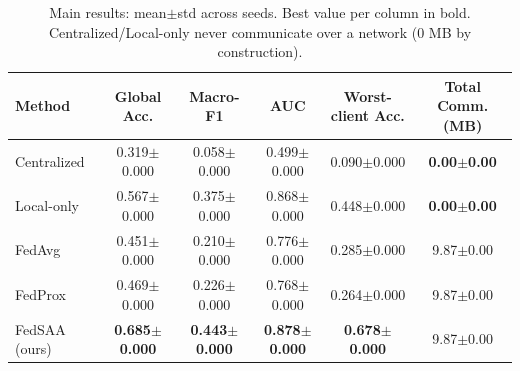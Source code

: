 \begin{table}[t]
\centering
\caption{Main results: mean$\pm$std across seeds. Best value per column in bold. Centralized/Local-only never communicate over a network (0 MB by construction).}
\label{tab:main_results}
\begin{tabular}{lccccc}
\toprule
Method & Global Acc. & Macro-F1 & AUC & Worst-client Acc. & Total Comm. (MB) \\
\midrule
Centralized & 0.319$\pm$0.000 & 0.058$\pm$0.000 & 0.499$\pm$0.000 & 0.090$\pm$0.000 & \textbf{0.00$\pm$0.00} \\
Local-only & 0.567$\pm$0.000 & 0.375$\pm$0.000 & 0.868$\pm$0.000 & 0.448$\pm$0.000 & \textbf{0.00$\pm$0.00} \\
FedAvg & 0.451$\pm$0.000 & 0.210$\pm$0.000 & 0.776$\pm$0.000 & 0.285$\pm$0.000 & 9.87$\pm$0.00 \\
FedProx & 0.469$\pm$0.000 & 0.226$\pm$0.000 & 0.768$\pm$0.000 & 0.264$\pm$0.000 & 9.87$\pm$0.00 \\
FedSAA (ours) & \textbf{0.685$\pm$0.000} & \textbf{0.443$\pm$0.000} & \textbf{0.878$\pm$0.000} & \textbf{0.678$\pm$0.000} & 9.87$\pm$0.00 \\
\bottomrule
\end{tabular}
\end{table}
